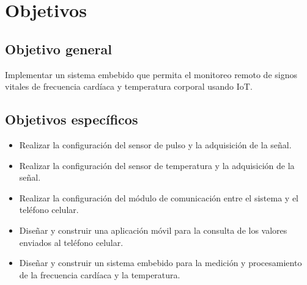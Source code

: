 \section{Objetivos}
\subsection{Objetivo general}
Implementar un sistema embebido que permita el monitoreo remoto de signos vitales de frecuencia cardíaca y temperatura corporal usando IoT.
\subsection{Objetivos específicos}
	\begin{itemize}
		\item Realizar la configuración del sensor de pulso y la adquisición de la señal.
		\item Realizar la configuración del sensor de temperatura y la adquisición de la señal.
		\item Realizar la configuración del módulo de comunicación entre el sistema y el teléfono celular.
		\item Diseñar y construir una aplicación móvil para la consulta de los valores enviados al teléfono celular.
		\item Diseñar y construir un sistema embebido para la medición y procesamiento de la frecuencia cardíaca y la temperatura.
	\end{itemize}	

